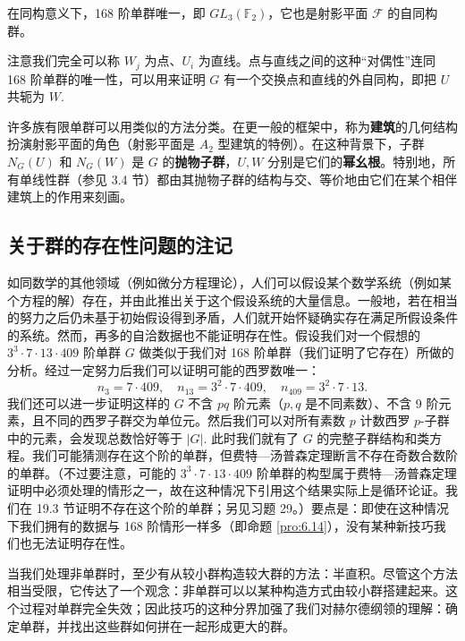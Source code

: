 \begin{theorem}\label{thm:6.15}
在同构意义下，168 阶单群唯一，即 \(GL_3(\mathbb{F}_2)\)，它也是射影平面 \(\mathcal{F}\) 的自同构群。
\end{theorem}

注意我们完全可以称 \(W_j\) 为点、\(U_i\) 为直线。点与直线之间的这种“对偶性”连同 168 阶单群的唯一性，可以用来证明 \(G\) 有一个交换点和直线的外自同构，即把 \(U\) 共轭为 \(W\).

许多族有限单群可以用类似的方法分类。在更一般的框架中，称为\textbf{建筑}的几何结构扮演射影平面的角色（射影平面是 \(A_2\) 型建筑的特例）。在这种背景下，子群 \(N_G(U)\) 和 \(N_G(W)\) 是 \(G\) 的\textbf{抛物子群}，\(U, W\) 分别是它们的\textbf{幂幺根}。特别地，所有单线性群（参见 3.4 节）都由其抛物子群的结构与交、等价地由它们在某个相伴建筑上的作用来刻画。

\subsection*{关于群的存在性问题的注记}

如同数学的其他领域（例如微分方程理论），人们可以假设某个数学系统（例如某个方程的解）存在，并由此推出关于这个假设系统的大量信息。一般地，若在相当的努力之后仍未基于初始假设得到矛盾，人们就开始怀疑确实存在满足所假设条件的系统。然而，再多的自洽数据也不能证明存在性。假设我们对一个假想的 \(3^3 \cdot 7 \cdot 13 \cdot 409\) 阶单群 \(G\) 做类似于我们对 168 阶单群（我们证明了它存在）所做的分析。经过一定努力后我们可以证明可能的西罗数唯一：
\[
n_3 = 7 \cdot 409, \quad n_{13} = 3^2 \cdot 7 \cdot 409, \quad n_{409} = 3^2 \cdot 7 \cdot 13.
\]
我们还可以进一步证明这样的 \(G\) 不含 \(pq\) 阶元素（\(p, q\) 是不同素数）、不含 9 阶元素，且不同的西罗子群交为单位元。然后我们可以对所有素数 \(p\) 计数西罗 \(p\)-子群中的元素，会发现总数恰好等于 \(|G|\). 此时我们就有了 \(G\) 的完整子群结构和类方程。我们可能猜测存在这个阶的单群，但费特—汤普森定理断言不存在奇数合数阶的单群。（不过要注意，可能的 \(3^3 \cdot 7 \cdot 13 \cdot 409\) 阶单群的构型属于费特—汤普森定理证明中必须处理的情形之一，故在这种情况下引用这个结果实际上是循环论证。我们在 19.3 节证明不存在这个阶的单群；另见习题 29。）要点是：即使在这种情况下我们拥有的数据与 168 阶情形一样多（即命题 \ref{pro:6.14}），没有某种新技巧我们也无法证明存在性。

当我们处理非单群时，至少有从较小群构造较大群的方法：半直积。尽管这个方法相当受限，它传达了一个观念：非单群可以以某种构造方式由较小群搭建起来。这个过程对单群完全失效；因此技巧的这种分界加强了我们对赫尔德纲领的理解：确定单群，并找出这些群如何拼在一起形成更大的群。

